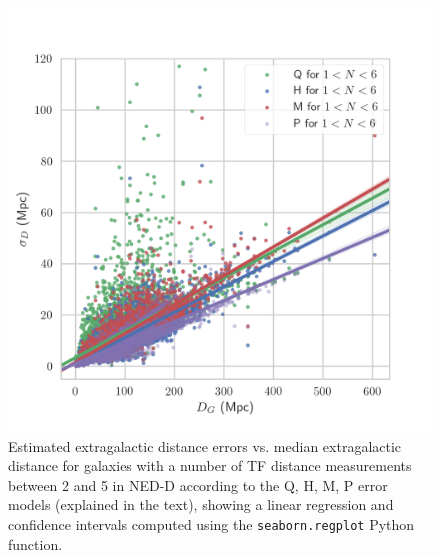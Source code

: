 \documentclass[a4paper,fleqn,usenatbib]{mnras}
\begin{document}
\begin{figure}
	\includegraphics[scale=0.7]{hqmlow.png}
    \caption{Estimated extragalactic distance errors vs. median extragalactic distance for galaxies with a number of TF distance measurements between 2 and 5 in NED-D according to the Q, H, M, P error models (explained in the text), showing a linear regression and confidence intervals computed using the \texttt{seaborn.regplot} Python function.}
    \label{fig:hqmlow}
\end{figure}
\end{document}

